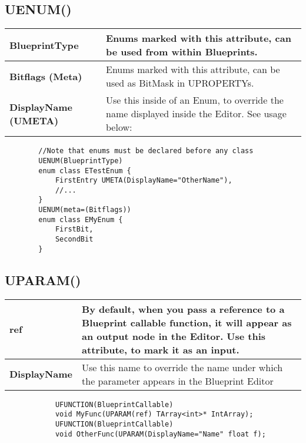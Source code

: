 \documentclass[10pt]{article}
\begin{document}
\begin{multicols*}{5}
	
	\subsection{UENUM()}
	
	\begin{tabularx}{\columnwidth}{|l|X|}
		\hline \textbf{BlueprintType}
		& Enums marked with this attribute, can be used from within Blueprints. \\
		\hline \textbf{Bitflags (Meta)}
		& Enums marked with this attribute, can be used as BitMask in UPROPERTYs. \\
		\hline \textbf{DisplayName (UMETA)}
		& Use this inside of an Enum, to override the name displayed inside the Editor. See usage below: \\
		\hline
	\end{tabularx}
	
	\begin{minipage}{\columnwidth}
	\begin{verbatim}
		//Note that enums must be declared before any class
		UENUM(BlueprintType)
		enum class ETestEnum {
		    FirstEntry UMETA(DisplayName="OtherName"), 
		    //...
		}
		UENUM(meta=(Bitflags))
		enum class EMyEnum {
			FirstBit,
			SecondBit
		}
	\end{verbatim} 
	\end{minipage}

	\subsection{UPARAM()}
	\begin{tabularx}{\columnwidth}{|l|X|}
			\hline \textbf{ref}
			& By default, when you pass a reference to a Blueprint callable function, it will appear as an output node in the Editor. Use this attribute, to mark it as an input.\\
			\hline \textbf{DisplayName}
			& Use this name to override the name under which the parameter appears in the Blueprint Editor \\
			\hline
	\end{tabularx}
	
	\begin{minipage}{\columnwidth}
		\begin{verbatim}
			UFUNCTION(BlueprintCallable)
			void MyFunc(UPARAM(ref) TArray<int>* IntArray);
			UFUNCTION(BlueprintCallable)
			void OtherFunc(UPARAM(DisplayName="Name" float f);
		\end{verbatim}
	\end{minipage}
	

\end{multicols*}
\end{document}
